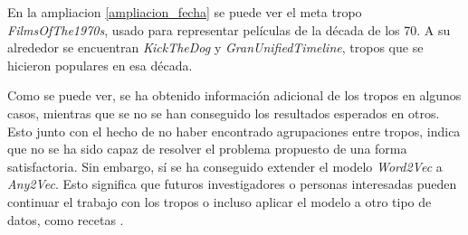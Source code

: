 En la ampliacion \ref{ampliacion_fecha} se puede ver el meta tropo \textit{FilmsOfThe1970s}, usado para representar películas de la década de los 70. A su alrededor se encuentran
\textit{KickTheDog} y \textit{GranUnifiedTimeline}, tropos que se hicieron populares en esa década.

Como se puede ver, se ha obtenido información adicional de los tropos en algunos casos, mientras que se no se han conseguido los resultados esperados en otros.
Esto junto con el hecho de no haber encontrado agrupaciones entre tropos, indica que no se ha sido capaz
de resolver el problema propuesto de una forma satisfactoria. Sin embargo, sí se ha conseguido extender el modelo \textit{Word2Vec} a \textit{Any2Vec}. Esto significa
que futuros investigadores o personas interesadas pueden continuar el trabajo con los tropos o incluso aplicar el modelo a otro tipo de datos, como recetas \cite{kazama2018neural}.
